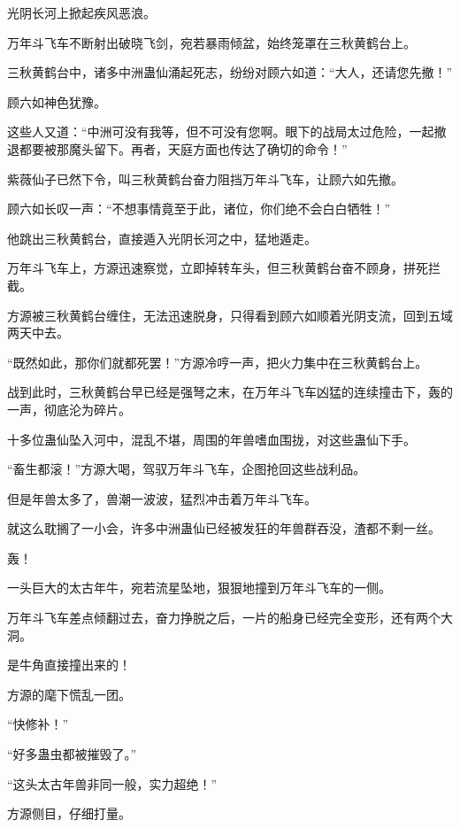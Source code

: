 
\begin{this_body}

光阴长河上掀起疾风恶浪。

万年斗飞车不断射出破晓飞剑，宛若暴雨倾盆，始终笼罩在三秋黄鹤台上。

三秋黄鹤台中，诸多中洲蛊仙涌起死志，纷纷对顾六如道：“大人，还请您先撤！”

顾六如神色犹豫。

这些人又道：“中洲可没有我等，但不可没有您啊。眼下的战局太过危险，一起撤退都要被那魔头留下。再者，天庭方面也传达了确切的命令！”

紫薇仙子已然下令，叫三秋黄鹤台奋力阻挡万年斗飞车，让顾六如先撤。

顾六如长叹一声：“不想事情竟至于此，诸位，你们绝不会白白牺牲！”

他跳出三秋黄鹤台，直接遁入光阴长河之中，猛地遁走。

万年斗飞车上，方源迅速察觉，立即掉转车头，但三秋黄鹤台奋不顾身，拼死拦截。

方源被三秋黄鹤台缠住，无法迅速脱身，只得看到顾六如顺着光阴支流，回到五域两天中去。

“既然如此，那你们就都死罢！”方源冷哼一声，把火力集中在三秋黄鹤台上。

战到此时，三秋黄鹤台早已经是强弩之末，在万年斗飞车凶猛的连续撞击下，轰的一声，彻底沦为碎片。

十多位蛊仙坠入河中，混乱不堪，周围的年兽嗜血围拢，对这些蛊仙下手。

“畜生都滚！”方源大喝，驾驭万年斗飞车，企图抢回这些战利品。

但是年兽太多了，兽潮一波波，猛烈冲击着万年斗飞车。

就这么耽搁了一小会，许多中洲蛊仙已经被发狂的年兽群吞没，渣都不剩一丝。

轰！

一头巨大的太古年牛，宛若流星坠地，狠狠地撞到万年斗飞车的一侧。

万年斗飞车差点倾翻过去，奋力挣脱之后，一片的船身已经完全变形，还有两个大洞。

是牛角直接撞出来的！

方源的麾下慌乱一团。

“快修补！”

“好多蛊虫都被摧毁了。”

“这头太古年兽非同一般，实力超绝！”

方源侧目，仔细打量。


\end{this_body}
